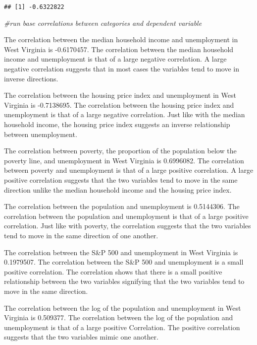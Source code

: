 \documentclass[
]{article}
\newenvironment{Shaded}{\begin{snugshade}}{\end{snugshade}}
\newcommand{\CommentTok}[1]{\textcolor[rgb]{0.56,0.35,0.01}{\textit{#1}}}
\begin{document}
\begin{verbatim}
## [1] -0.6322822
\end{verbatim}

\begin{Shaded}
\begin{Highlighting}[]
\CommentTok{#run base correlations between categories and dependent variable}
\end{Highlighting}
\end{Shaded}

The correlation between the median household income and unemployment in
West Virginia is -0.6170457. The correlation between the median
household income and unemployment is that of a large negative
correlation. A large negative correlation suggests that in most cases
the variables tend to move in inverse directions.

The correlation between the housing price index and unemployment in West
Virginia is -0.7138695. The correlation between the housing price index
and unemployment is that of a large negative correlation. Just like with
the median household income, the housing price index suggests an inverse
relationship between unemployment.

The correlation between poverty, the proportion of the population below
the poverty line, and unemployment in West Virginia is 0.6996082. The
correlation between poverty and unemployment is that of a large positive
correlation. A large positive correlation suggests that the two
variables tend to move in the same direction unlike the median household
income and the housing price index.

The correlation between the population and unemployment is 0.5144306.
The correlation between the population and unemployment is that of a
large positive correlation. Just like with poverty, the correlation
suggests that the two variables tend to move in the same direction of
one another.

The correlation between the S\&P 500 and unemployment in West Virginia
is 0.1979507. The correlation between the S\&P 500 and unemployment is a
small positive correlation. The correlation shows that there is a small
positive relationship between the two variables signifying that the two
variables tend to move in the same direction.

The correlation between the log of the population and unemployment in
West Virginia is 0.509377. The correlation between the log of the
population and unemployment is that of a large positive Correlation. The
positive correlation suggests that the two variables mimic one another.
\end{document}
